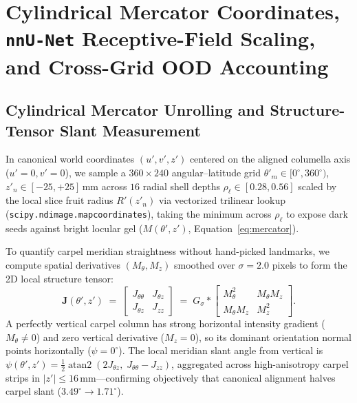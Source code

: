 \documentclass[10pt,a4paper]{article}
\renewcommand{\_}{\origunderscore\allowbreak}
\begin{document}
\clearpage
\section[Mercator, RF \& Cross-Grid OOD]{Cylindrical Mercator Coordinates, \texttt{nnU-Net} Receptive-Field Scaling, and Cross-Grid OOD Accounting}
\label{app:mercator_rf}

\subsection{Cylindrical Mercator Unrolling and Structure-Tensor Slant Measurement}

In canonical world coordinates $(u', v', z')$ centered on the aligned columella axis ($u'=0, v'=0$), we sample a $360 \times 240$ angular--latitude grid $\theta'_m \in [0^\circ, 360^\circ)$, $z'_n \in [-25, +25]\,\text{mm}$ across $16$ radial shell depths $\rho_\ell \in [0.28, 0.56]$ scaled by the local slice fruit radius $R'(z'_n)$ via vectorized trilinear lookup (\texttt{scipy.ndimage.map\_coordinates}), taking the minimum across $\rho_\ell$ to expose dark seeds against bright locular gel ($M(\theta', z')$, Equation~\ref{eq:mercator}).

To quantify carpel meridian straightness without hand-picked landmarks, we compute spatial derivatives $(M_\theta, M_z)$ smoothed over $\sigma = 2.0$ pixels to form the 2D local structure tensor:
\begin{equation}
    \mathbf{J}(\theta', z') \;=\;
    \begin{bmatrix} J_{\theta\theta} & J_{\theta z} \\ J_{\theta z} & J_{zz} \end{bmatrix}
    \;=\; G_\sigma *
    \begin{bmatrix} M_\theta^2 & M_\theta M_z \\ M_\theta M_z & M_z^2 \end{bmatrix}.
\end{equation}
A perfectly vertical carpel column has strong horizontal intensity gradient ($M_\theta \neq 0$) and zero vertical derivative ($M_z = 0$), so its dominant orientation normal points horizontally ($\psi = 0^\circ$). The local meridian slant angle from vertical is $\psi(\theta', z') = \frac{1}{2}\operatorname{atan2}(2J_{\theta z},\; J_{\theta\theta} - J_{zz})$, aggregated across high-anisotropy carpel strips in $|z'| \le 16\,\text{mm}$---confirming objectively that canonical alignment halves carpel slant ($3.49^\circ \to 1.71^\circ$).
\end{document}
